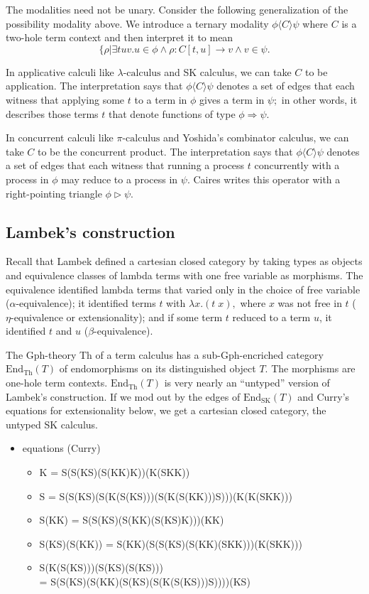 \documentclass[submission,copyright,creativecommons]{eptcs}
\newcommand{\maps}{\colon}
\newcommand{\End}{\mathrm{End}}
\newcommand{\Th}{\mathrm{Th}}
\newcommand{\pic}{$\pi\mbox{-calculus}$\xspace}
\newcommand{\lac}{$\lambda\mbox{-calculus}$\xspace}
\begin{document}
The modalities need not be unary.  Consider the following generalization of the possibility modality above.  We introduce a ternary modality $\phi \langle C \rangle \psi$ where $C$ is a two-hole term context and then interpret it to mean 
\[\{ \rho | \exists tuv. u \in \phi \land \rho\maps C[t, u] \to v \land v \in \psi.\]

In applicative calculi like \lac and SK calculus, we can take $C$ to be application.  The interpretation says that $\phi \langle C \rangle \psi$ denotes a set of edges that each witness that applying some $t$ to a term in $\phi$ gives a term in $\psi;$ in other words, it describes those terms $t$ that denote functions of type $\phi \Rightarrow \psi.$

In concurrent calculi like \pic and Yoshida's combinator calculus, we can take $C$ to be the concurrent product.  The interpretation says that $\phi \langle C \rangle \psi$ denotes a set of edges that each witness that running a process $t$ concurrently with a process in $\phi$ may reduce to a process in $\psi.$  Caires writes this operator with a right-pointing triangle $\phi \triangleright \psi.$

\subsection{Lambek's construction}

Recall that Lambek defined a cartesian closed category by taking types as objects and equivalence classes of lambda terms with one free variable as morphisms.  The equivalence identified lambda terms that varied only in the choice of free variable ($\alpha\mbox{-}$equivalence); it identified terms $t$ with $\lambda x.(t\; x),$ where $x$ was not free in $t$ ($\eta\mbox{-}$equivalence or extensionality); and if some term $t$ reduced to a term $u$, it identified $t$ and $u$ ($\beta\mbox{-}$equivalence).

The Gph-theory Th of a term calculus has a sub-Gph-encriched category $\End_\Th(T)$ of endomorphisms on its distinguished object $T.$  The morphisms are one-hole term contexts.  $\End_\Th(T)$ is very nearly an ``untyped'' version of Lambek's construction.  If we mod out by the edges of $\End_{\mbox{SK}}(T)$ and Curry's equations for extensionality below, we get a cartesian closed category, the untyped SK calculus.

\begin{itemize}
  \item equations (Curry)
    \begin{itemize}
      \item K = S(S(KS)(S(KK)K))(K(SKK))
      \item S = S(S(KS)(S(K(S(KS)))(S(K(S(KK)))S)))(K(K(SKK)))
      \item S(KK) = S(S(KS)(S(KK)(S(KS)K)))(KK)
      \item S(KS)(S(KK)) = S(KK)(S(S(KS)(S(KK)(SKK)))(K(SKK)))
      \item S(K(S(KS)))(S(KS)(S(KS))) \\ = S(S(KS)(S(KK)(S(KS)(S(K(S(KS)))S))))(KS)
    \end{itemize}
\end{itemize}
\end{document}
